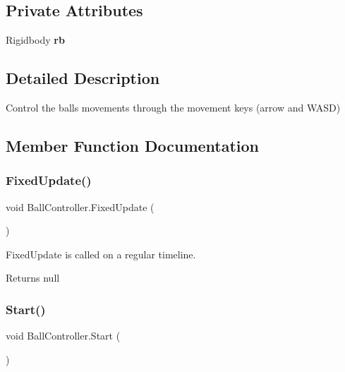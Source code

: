 \subsection*{Private Attributes}
\begin{DoxyCompactItemize}
\item 
\mbox{\label{class_ball_controller_a68dbed74d54e265094667ec25d7d22e1}} 
Rigidbody {\bfseries rb}
\end{DoxyCompactItemize}


\subsection{Detailed Description}
Control the ball\textquotesingle{}s movements through the movement keys (arrow and W\+A\+SD) 

\subsection{Member Function Documentation}
\mbox{\label{class_ball_controller_ae0868b9bae107709e252c86d436c907e}} 
\subsubsection{\texorpdfstring{FixedUpdate()}{FixedUpdate()}}
{\footnotesize\ttfamily void Ball\+Controller.\+Fixed\+Update (\begin{DoxyParamCaption}{ }\end{DoxyParamCaption})\hspace{0.3cm}{\ttfamily [private]}}



Fixed\+Update is called on a regular timeline. 

\begin{DoxyReturn}{Returns}
null 
\end{DoxyReturn}
\mbox{\label{class_ball_controller_a242683fa6f5b6282cb88b38312d4798a}} 
\subsubsection{\texorpdfstring{Start()}{Start()}}
{\footnotesize\ttfamily void Ball\+Controller.\+Start (\begin{DoxyParamCaption}{ }\end{DoxyParamCaption})\hspace{0.3cm}{\ttfamily [private]}}



